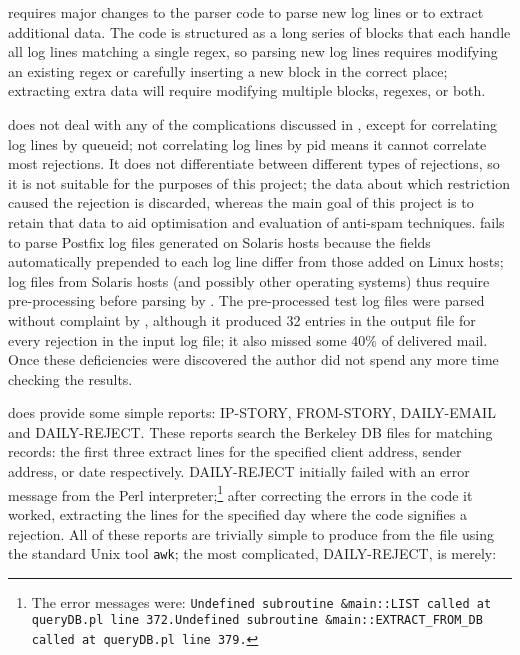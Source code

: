  requires major changes to the parser code to parse new log lines
or to extract additional data.  The code is structured as a long series of
blocks that each handle all log lines matching a single regex, so parsing
new log lines requires modifying an existing regex or carefully inserting a
new block in the correct place; extracting extra data will require
modifying multiple blocks, regexes, or both.

 does not deal with any of the complications discussed in
, except for correlating log lines by queueid;
not correlating log lines by pid means it cannot correlate most rejections.
It does not differentiate between different types of rejections, so it is
not suitable for the purposes of this project; the data about which
restriction caused the rejection is discarded, whereas the main goal of
this project is to retain that data to aid optimisation and evaluation of
anti-spam techniques.   fails to parse Postfix log files
generated on Solaris hosts because the fields automatically prepended to
each log line differ from those added on Linux hosts; log files from
Solaris hosts (and possibly other operating systems) thus require
pre-processing before parsing by .  The \numberOFlogFILES{}
pre-processed test log files were parsed without complaint by
, although it produced 32 entries in the output 
file for every rejection in the input log file; it also missed some 40\% of
delivered mail.  Once these deficiencies were discovered the author did not
spend any more time checking the results.

 does provide some simple reports: IP-STORY, FROM-STORY,
DAILY-EMAIL and DAILY-REJECT\@.  These reports search the Berkeley DB files
for matching records: the first three extract  lines for the
specified client  address, sender address, or date
respectively.  DAILY-REJECT initially failed with an error message from the
Perl interpreter;\footnote{The error messages were:
\newline{}\texttt{Undefined subroutine \&main::LIST called at queryDB.pl
line 372.}\newline{}\texttt{Undefined subroutine \&main::EXTRACT\_FROM\_DB
called at queryDB.pl line 379.}} after correcting the errors in the code it
worked, extracting the  lines for the specified day where the
 code signifies a rejection.  All of these reports are
trivially simple to produce from the  file using the standard
Unix tool \texttt{awk}; the most complicated, DAILY-REJECT, is
merely:

